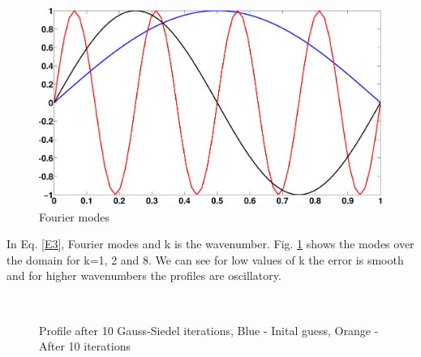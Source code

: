 \begin{figure}
 \centering
 \includegraphics[scale=0.2]{Fourier_modes.eps}
 \caption{Fourier modes}
 \label{Fig:modes}
\end{figure}

In Eq. \ref{E3}, Fourier modes and k is the wavenumber. Fig. \ref{Fig:modes} shows the modes over the domain for k=1, 2 and 8. We can see for low values of k the error is 
smooth and for higher wavenumbers the profiles are oscillatory.

\begin{figure}
\centering
 \\

 \caption{Profile after 10 Gauss-Siedel iterations, Blue - Inital guess, Orange - After 10 iterations}
 \label{Fig:modes_iter}
\end{figure}

